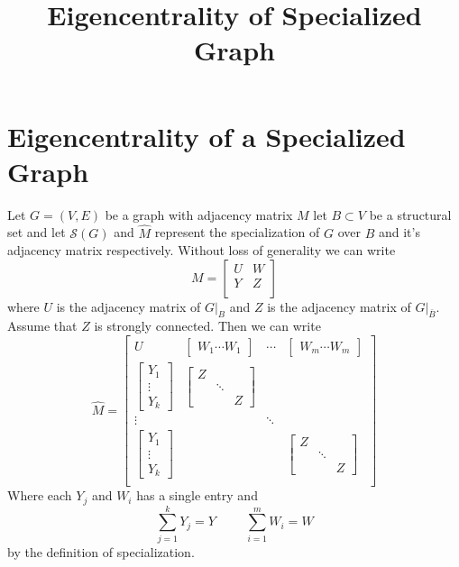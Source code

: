 \documentclass{paper}
\begin{document}
\title{Eigencentrality of Specialized Graph}
\section*{Eigencentrality of a Specialized Graph}

Let $G = (V,E)$ be a graph with adjacency matrix $M$ let $B \subset V$ be a structural set and let $\mathcal{S}(G)$ and $\hat{M}$ represent the specialization of $G$ over $B$ and it's adjacency matrix respectively. Without loss of generality we can write
\[M = \begin{bmatrix} U & W \\ Y & Z \\ \end{bmatrix} \] where $U$ is the adjacency matrix of $G|_{B}$ and $Z$ is the adjacency matrix of $G|_{\bar{B}}$. Assume that $Z$ is strongly connected. Then we can write 
\[\hat{M} = 
\begin{bmatrix}
	U & \begin{bmatrix}W_1\cdots W_1 \end{bmatrix} & \cdots & \begin{bmatrix}W_m\cdots W_m \end{bmatrix} \\

	\begin{bmatrix} Y_1 \\ \vdots \\ Y_k \end{bmatrix} & \begin{bmatrix} Z \\ & \ddots \\ & & Z \end{bmatrix} \\
	
	\vdots & & \ddots & \\
	
	\begin{bmatrix} Y_1 \\ \vdots \\ Y_k \end{bmatrix} & & & \begin{bmatrix} Z \\ & \ddots \\ & & Z \end{bmatrix} \\
	
\end{bmatrix}
\]
Where each $Y_j$ and $W_i$ has a single entry and 
\[\sum_{j=1}^{k} Y_j = Y \hspace{1cm} \sum_{i=1}^{m} W_i = W\]
by the definition of specialization.
\end{document}
